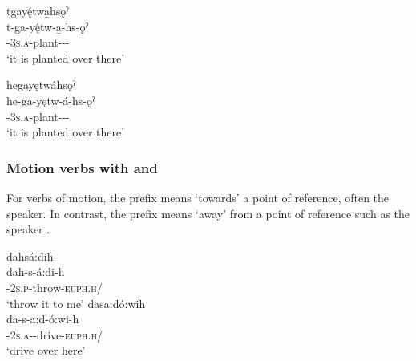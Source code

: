 \ea\label{ex:dhex2}

\ea tgayę́twa̱hsǫˀ\\
\gll t-ga-yę́tw-a̱-hs-ǫˀ\\
{\cislocative}-\textsc{3s.a}-plant-{\joinerA}-{\habitual}-\\
\glt `it is planted over there'

\newpage
\ex hegayętwáhsǫˀ\\
\gll he-ga-yętw-á-hs-ǫˀ\\
{\translocative}-\textsc{3s.a}-plant-{\joinerA}-{\habitual}-\\
\glt `it is planted over there'
\z
\z

\subsubsection*{Motion verbs with  {\cislocative} and  \textsc{\translocative}} \label{Motion verbs with [d-] (cislocative) and [heˀ-] (translocative)}
For verbs of motion, the  {\cislocative} prefix means ‘towards’ a point of reference, often the speaker. In contrast, the  {\translocative} prefix means ‘away’ from a point of reference such as the speaker . 

\ea\label{ex:dhex3}

\ea dahsá:dih\\
\gll dah-s-á:di-h\\
{\cislocative}-\textsc{2s.p}-throw-\textsc{euph.h}/{\noaspect}\\
\glt `throw it to me'
\ex dasa:dó:wih \\
\gll da-s-a:d-ó:wi-h \\
\textsc{\cislocative-2s.a}-{\semireflexive}-drive-\textsc{euph.h}/{\noaspect}\\
\glt ‘drive over here’


